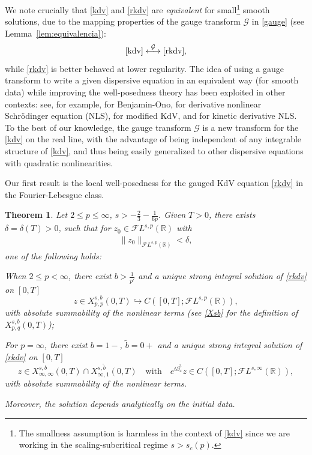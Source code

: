 \documentclass[a4paper,
11pt,  reqno]{amsart}
\newcommand{\5}{\textup{V}}
\newcommand{\noi}{\noindent}
\newcommand{\FL}{\mathcal{F} L}
\newcommand{\dl}{\delta}
\newtheorem{theorem}{Theorem} [section]
\theoremstyle{remark}
\newcommand{\R}{\mathbb{R}}
\newcommand{\Gc}{\mathcal{G}}
\numberwithin{equation}{section}
\numberwithin{theorem}{section}
\begin{document}
\medskip

    We note crucially that \eqref{kdv} and \eqref{rkdv} are \textit{equivalent} for small\footnote{The smallness assumption is harmless in the context of \eqref{kdv} since we are working in the scaling-subcritical regime $s>s_c(p)$.} smooth solutions, due to the mapping properties of the gauge transform $\Gc$ in \eqref{gauge} (see Lemma~\ref{lem:equivalencia}):
    $$
\eqref{kdv} \overset{\Gc}{\longleftrightarrow} \eqref{rkdv},
    $$
while \eqref{rkdv} is better behaved at lower regularity.
The idea of using a gauge transform to write a given dispersive equation in an equivalent way (for smooth data) while improving the well-posedness theory has been exploited in other contexts: see, for example,   \cite{IfrimTataru, MolinetPilod_bo, tao_bo} for Benjamin-Ono, \cite{CKSTT_dnls, Herr_dnls, takaoka_dnls} for derivative nonlinear Schr\"odinger equation (NLS), \cite{Chapouto_FL_mkdv} for modified KdV, and \cite{KishimotoTsutsumi_kdnls} for kinetic derivative NLS.
To the best of our knowledge, the gauge transform $\Gc$ is a new transform for the \eqref{kdv} on the real line, with the advantage of being independent of
any integrable structure of \eqref{kdv}, and thus being easily generalized to other dispersive equations with quadratic nonlinearities.

\medskip

 Our first result is the local well-posedness for the gauged KdV equation \eqref{rkdv} in the Fourier-Lebesgue class.

	\begin{theorem}\label{thm:lwp_rkdv}
Let $2 \le p \le \infty$, $s> - \frac23 - \frac{1}{6p}$. Given $T>0$, there exists $\dl = \dl(T)>0$, such that for $z_0 \in \FL^{s, p}(\R)$ with
\begin{align}
    \|z_0\|_{\FL^{s,p}(\R)} < \dl,
\end{align}
one of the following holds:

\vspace{1mm}

\noi{\rm(i)}
When $ 2 \le p <\infty$,
there exist $b>\frac{1}{p'}$ and  a unique strong integral solution of \eqref{rkdv} on $[0,T]$
	$$z\in X^{s,b}_{p, p}(0,T)\hookrightarrow C([0,T]; \mathcal{F}L^{s,p}(\R)),$$
    with absolute summability of the nonlinear terms (see \eqref{Xsb} for the definition of $X^{s,b}_{p,q}(0,T)$);

\vspace{1mm}

\smallskip
\noi{\rm(ii)}
For $p=\infty$, there exist $b=1-$, $\tilde{b}=0+$ and a unique strong integral solution of \eqref{rkdv} on $[0,T]$
	$$z\in X^{s,b}_{\infty,\infty}(0,T)\cap X^{s,\tilde{b}}_{\infty,1}(0,T)
    \quad
    \text{with}
    \quad
    e^{t\partial_x^3}z \in C([0,T]; \mathcal{F}L^{s,\infty}(\R))
    ,
    $$
    with absolute summability of the nonlinear terms.

\smallskip
\noi
    Moreover, the solution depends analytically on the initial data.
\end{theorem}
\end{document}
